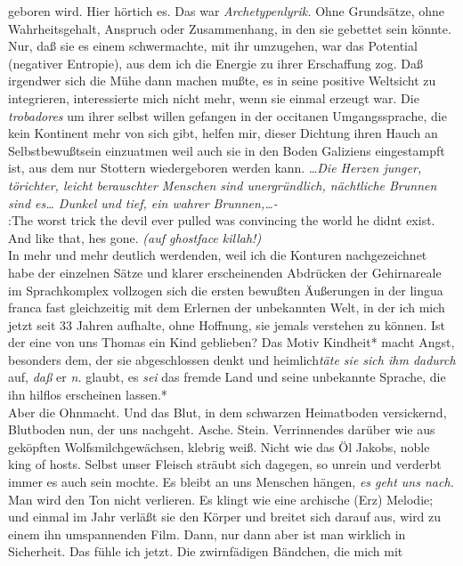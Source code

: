 \documentclass[
]{article}
\begin{document}
geboren wird. Hier hörtich es. Das war \emph{Archetypenlyrik.} Ohne
Grundsätze, ohne Wahrheitsgehalt, Anspruch oder Zusammenhang, in den sie
gebettet sein könnte. Nur, daß sie es einem schwermachte, mit ihr
umzugehen, war das Potential (negativer Entropie), aus dem ich die
Energie zu ihrer Erschaffung zog. Daß irgendwer sich die Mühe dann
machen mußte, es in seine positive Weltsicht zu integrieren,
interessierte mich nicht mehr, wenn sie einmal erzeugt war. Die
\emph{trobadores} um ihrer selbst willen gefangen in der occitanen
Umgangssprache, die kein Kontinent mehr von sich gibt, helfen mir,
dieser Dichtung ihren Hauch an Selbstbewußtsein einzuatmen weil auch sie
in den Boden Galiziens eingestampft ist, aus dem nur Stottern
wiedergeboren werden kann. \ldots{}\emph{Die Herzen junger, törichter,
leicht berauschter Menschen sind unergründlich, nächtliche Brunnen sind
es\ldots{} Dunkel und tief, ein wahrer Brunnen,\ldots-}\\
:The worst trick the devil ever pulled was convincing the world he
didn\textquotesingle t exist. And like that, he\textquotesingle s gone.
\emph{(auf ghostface killah!)}\\
In mehr und mehr deutlich werdenden, weil ich die Konturen
nachgezeichnet habe der einzelnen Sätze und klarer erscheinenden
Abdrücken der Gehirnareale im Sprachkomplex vollzogen sich die ersten
bewußten Äußerungen in der lingua franca fast gleichzeitig mit dem
Erlernen der unbekannten Welt, in der ich mich jetzt seit 33 Jahren
aufhalte, ohne Hoffnung, sie jemals verstehen zu können. Ist der eine
von uns Thomas ein Kind geblieben? Das Motiv Kindheit* macht Angst,
besonders dem, der sie abgeschlossen denkt und heimlich\emph{täte sie
sich ihm dadurch} auf, \emph{daß} er \emph{n.} glaubt, es \emph{sei }das
fremde Land und seine unbekannte Sprache, die ihn hilflos erscheinen
lassen.*\\
Aber die Ohnmacht. Und das Blut, in dem schwarzen Heimatboden
versickernd, Blutboden nun, der uns nachgeht. Asche. Stein. Verrinnendes
darüber wie aus geköpften Wolfsmilchgewächsen, klebrig weiß. Nicht wie
das Öl Jakobs, noble king of hosts. Selbst unser Fleisch sträubt sich
dagegen, so unrein und verderbt immer es auch sein mochte. Es bleibt an
uns Menschen hängen, \emph{es geht uns nach. }Man wird den Ton nicht
verlieren. Es klingt wie eine archische (Erz) Melodie; und einmal im
Jahr verläßt sie den Körper und breitet sich darauf aus, wird zu einem
ihn umspannenden Film. Dann, nur dann aber ist man wirklich in
Sicherheit. Das fühle ich jetzt. Die zwirnfädigen Bändchen, die mich mit
\end{document}
